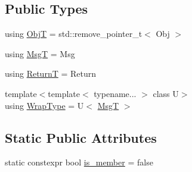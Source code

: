 \subsection*{Public Types}
\begin{DoxyCompactItemize}
\item 
using \hyperlink{structvt_1_1util_1_1fntraits_1_1detail_1_1_obj_func_traits_impl_3_01std_1_1enable__if__t_3_07std893b55e280057f64eb5acd3df924485e_a32abbdb49b0ae285449152af59d20fe9}{ObjT} = std\+::remove\+\_\+pointer\+\_\+t$<$ Obj $>$
\item 
using \hyperlink{structvt_1_1util_1_1fntraits_1_1detail_1_1_obj_func_traits_impl_3_01std_1_1enable__if__t_3_07std893b55e280057f64eb5acd3df924485e_a07b53799e22d96567eb141e3eeafb094}{MsgT} = Msg
\item 
using \hyperlink{structvt_1_1util_1_1fntraits_1_1detail_1_1_obj_func_traits_impl_3_01std_1_1enable__if__t_3_07std893b55e280057f64eb5acd3df924485e_a787619e304f142c09aec7d5c6365ebeb}{ReturnT} = Return
\item 
{\footnotesize template$<$template$<$ typename... $>$ class U$>$ }\\using \hyperlink{structvt_1_1util_1_1fntraits_1_1detail_1_1_obj_func_traits_impl_3_01std_1_1enable__if__t_3_07std893b55e280057f64eb5acd3df924485e_af4aae584a92ed5ef3bc75aaa7431600e}{Wrap\+Type} = U$<$ \hyperlink{structvt_1_1util_1_1fntraits_1_1detail_1_1_obj_func_traits_impl_3_01std_1_1enable__if__t_3_07std893b55e280057f64eb5acd3df924485e_a07b53799e22d96567eb141e3eeafb094}{MsgT} $>$
\end{DoxyCompactItemize}
\subsection*{Static Public Attributes}
\begin{DoxyCompactItemize}
\item 
static constexpr bool \hyperlink{structvt_1_1util_1_1fntraits_1_1detail_1_1_obj_func_traits_impl_3_01std_1_1enable__if__t_3_07std893b55e280057f64eb5acd3df924485e_ae3b5f74da9cb29b8d6633662a7a10cca}{is\+\_\+member} = false
\end{DoxyCompactItemize}


